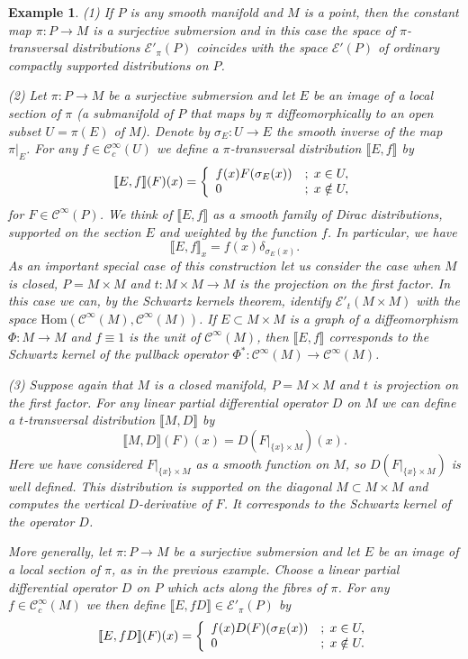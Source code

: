 \documentclass[a4paper]{amsart}
\newtheorem{ex}[dfn]{Example}
\newcommand{\cE}{\mathcal{E}}
\newcommand{\Hom}{\text{Hom}}
\newcommand{\C}{\mathord{\mathcal{C}^{\infty}}}
\newcommand{\Cc}{\mathord{\mathcal{C}^{\infty}_{c}}}
\begin{document}
\begin{ex} \rm
(1) If $P$ is any smooth manifold and $M$ is a point, then the constant map $\pi:P\to M$ is a surjective submersion and in this
case the space of $\pi$-transversal distributions $\cE'_{\pi}(P)$ coincides with the space $\cE'(P)$ 
of ordinary compactly supported distributions on $P$.

(2) Let $\pi:P\to M$ be a surjective submersion and let $E$ be an image of a local section of $\pi$ 
(a submanifold of $P$ that maps by $\pi$ diffeomorphically to an open subset $U=\pi(E)$ of $M$). 
Denote by $\sigma_{E}:U\to E$ the smooth inverse of the map $\pi|_{E}$. For any $f\in\Cc(U)$ we define a $\pi$-transversal distribution 
$\llbracket E,f\rrbracket$ by
\[
\llbracket E,f\rrbracket(F)(x)=
\left\{ \begin{array} {ll}
      f(x)F(\sigma_{E}(x))   &;\hspace{1mm}x\in U,\\
      0                      &;\hspace{1mm}x\notin U,
       \end{array}\right.
\]
for $F\in\C(P)$. We think of $\llbracket E,f\rrbracket$ as a smooth family of Dirac distributions, supported on the section $E$ and weighted by
the function $f$. In particular, we have
\[
\llbracket E,f\rrbracket_{x}=f(x)\delta_{\sigma_{E}(x)}.
\] 
As an important special case of this construction let us consider the case when $M$ is closed, 
$P=M\times M$ and $t:M\times M\to M$ is the projection on the first factor. In this case
we can, by the Schwartz kernels theorem, identify $\cE'_{t}(M\times M)$ with the space $\Hom(\C(M),\C(M))$.
If $E\subset M\times M$ is a graph of a diffeomorphism $\Phi:M\to M$ and $f\equiv 1$ is the unit of $\C(M)$, then $\llbracket E,f\rrbracket$ 
corresponds to the Schwartz kernel of the pullback operator $\Phi^{*}:\C(M)\to\C(M)$.

(3) Suppose again that $M$ is a closed manifold, $P=M\times M$ and $t$ is projection on the first factor. For any linear partial differential
operator $D$ on $M$ we can define a $t$-transversal distribution $\llbracket M,D\rrbracket$ by
\[
\llbracket M,D\rrbracket(F)(x)=D(F|_{\{x\}\times M})(x).
\]
Here we have considered $F|_{\{x\}\times M}$ as a smooth function on $M$, so $D(F|_{\{x\}\times M})$ is well defined. This distribution is supported
on the diagonal $M\subset M\times M$ and computes the vertical $D$-derivative of $F$. It corresponds to the Schwartz kernel of the operator $D$.

More generally, let $\pi:P\to M$ be a surjective submersion and let $E$ be an image of a local section of $\pi$, as in the previous example.
Choose a linear partial differential operator $D$ on $P$ which acts along the fibres of $\pi$. For any $f\in\Cc(M)$ we then define 
$\llbracket E,fD\rrbracket\in\cE'_{\pi}(P)$ by
\[
\llbracket E,fD\rrbracket(F)(x)=
\left\{ \begin{array} {ll}
      f(x)D(F)(\sigma_{E}(x))   &;\hspace{1mm}x\in U,\\
      0                      &;\hspace{1mm}x\notin U.
       \end{array}\right.
\]


\end{ex}
\end{document}
